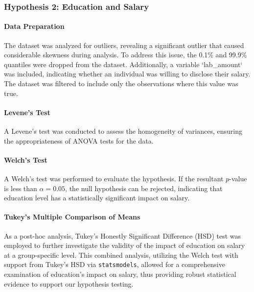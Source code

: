\subsubsection{Hypothesis 2: Education and Salary}

\paragraph{Data Preparation}
The dataset was analyzed for outliers, revealing a significant outlier that caused considerable skewness during analysis. To address this issue, the 0.1\% and 99.9\% quantiles were dropped from the dataset. Additionally, a variable `lab\_amount` was included, indicating whether an individual was willing to disclose their salary. The dataset was filtered to include only the observations where this value was true.

\paragraph{Levene's Test}
A Levene's test was conducted to assess the homogeneity of variances, ensuring the appropriateness of ANOVA tests for the data.

\paragraph{Welch's Test}
A Welch's test was performed to evaluate the hypothesis. If the resultant $p$-value is less than \( \alpha = 0.05 \), the null hypothesis can be rejected, indicating that education level has a statistically significant impact on salary.

\paragraph{Tukey's Multiple Comparison of Means}
As a post-hoc analysis, Tukey's Honestly Significant Difference (HSD) test was employed to further investigate the validity of the impact of education on salary at a group-specific level. This combined analysis, utilizing the Welch test with support from Tukey's HSD via \texttt{statsmodels}, allowed for a comprehensive examination of education's impact on salary, thus providing robust statistical evidence to support our hypothesis testing.
